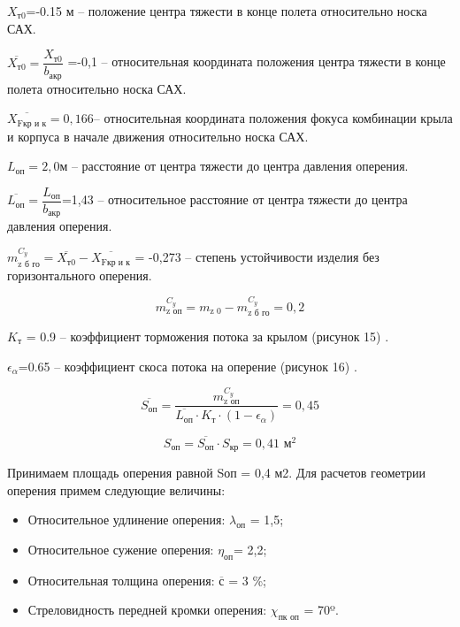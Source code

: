 $X_\text{т0}$=-0.15 м – положение центра тяжести в конце полета относительно носка САХ.

$\overline{X_\text{т0}} = \dfrac{X_\text{т0}}{b_\text{акр}} $ =-0,1 – относительная координата положения центра тяжести в конце полета относительно носка САХ.

$\overline{ X_\text{Fкр и к} }=0,166 $– относительная координата положения фокуса комбинации крыла и корпуса в начале движения относительно носка САХ.

$L_\text{оп}=2,0$м – расстояние от центра тяжести до центра давления оперения.

$\overline{L_\text{оп}} = \dfrac{L_\text{оп}}{b_\text{акр}} $=1,43 – относительное расстояние от центра тяжести до центра давления оперения.

$m_\text{z б го}^{C_y} = \overline{X_\text{т0}} - \overline{X_\text{Fкр и к} } $ = -0,273 – степень устойчивости изделия без горизонтального оперения.

$$m_\text{z оп}^{C_y}=m_\text{z 0} - m_\text{z б го} ^{C_y} =0,2$$

$K_\text{т}$ = 0.9 – коэффициент торможения потока за крылом (рисунок 15) \cite{Astakhova}.

$\epsilon_\alpha $=0.65 – коэффициент скоса потока на оперение (рисунок 16) \cite{Astakhova}.

$$\overline{S_\text{оп}} = \dfrac{ m_\text{z оп}^{C_y} } { \overline{L_\text{оп}} \cdot K_\text{т} \cdot ( 1-\epsilon_\alpha) } =0,45$$

$$S_\text{оп}= \overline{S_\text{оп}} \cdot S_\text{кр}  = 0,41 \text{ м}^2$$


Принимаем площадь оперения равной Sоп = 0,4 м2. Для расчетов геометрии оперения примем следующие величины:
\begin{itemize}
 \item Относительное удлинение оперения:			$\lambda_\text{оп}$ = 1,5;
 \item Относительное сужение оперения:				$\eta_\text{оп} $= 2,2;
 \item Относительная толщина оперения:				$\overline{с} $ = 3 \%;
 \item Стреловидность передней кромки оперения:		$\chi_\text{пк оп} $ = 70º.
\end{itemize}

